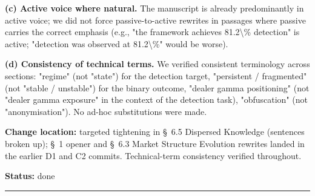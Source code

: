 \documentclass[11pt,a4paper]{article}
\begin{document}
\textbf{(c) Active voice where natural.} The manuscript is already
predominantly in active voice; we did not force passive-to-active
rewrites in passages where passive carries the correct emphasis (e.g.,
"the framework achieves 81.2\textbackslash{}\% detection" is active; "detection was
observed at 81.2\textbackslash{}\%" would be worse).

\textbf{(d) Consistency of technical terms.} We verified consistent
terminology across sections: "regime" (not "state") for the detection
target, "persistent / fragmented" (not "stable / unstable") for the
binary outcome, "dealer gamma positioning" (not "dealer gamma
exposure" in the context of the detection task), "obfuscation"
(not "anonymisation"). No ad-hoc substitutions were made.

\textbf{Change location:} targeted tightening in \S{}~6.5 Dispersed Knowledge
(sentences broken up); \S{}~1 opener and \S{}~6.3 Market Structure Evolution
rewrites landed in the earlier D1 and C2 commits. Technical-term
consistency verified throughout.

\textbf{Status:} done

\bigskip\hrule\bigskip
\end{document}
